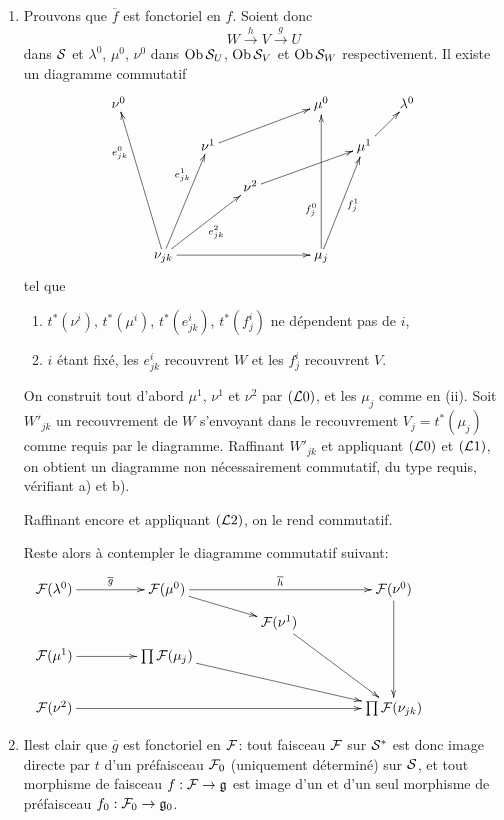\documentclass[10pt]{../fichiers-configuration-latex/smfart}
\begin{document}
\begin{enumerate}
\item Prouvons que $\overline{f}$ est fonctoriel en $f$. Soient donc
$$
W \xrightarrow{h} V \xrightarrow{g}U
$$
dans ${\mathcal S}$ et $\lambda^{0}$, $\mu^{0}$, $\nu^{0}$ dans $\operatorname{Ob}
{\mathcal S}_U$, $\operatorname{Ob} {\mathcal S}_{V}$ et $\operatorname{Ob} {\mathcal S}_W$ respectivement. Il existe un diagramme commutatif
\[
\xymatrix@C=.5cm@R=.5cm{
\nu^{0}  &         &          &         &        &\mu^{0} &        & \lambda^{0}\\
         &         &\nu^{1}\ar[rrru]   &         &        & &\mu^{1}\ar[ru] &            \\
         &         &          & {\nu^{2}}\ar[rrru] &       &&         &\\
         &        &         &         &       & &        & \\
         &\nu_{jk} \ar[luuuu]^(.7){e^{0}_{jk}} \ar[uuur]^(.7){e^{1}_{jk}} \ar[rruu]_{e^{2}_{jk}} \ar[rrrr]&  &        &         & \mu_j \ar[uuur]_{f^{1}_j}   \ar[uuuu]^(.3){f^{0}_j}  &         &
}
\]
tel que

\begin{enumerate}
\renewcommand{\theenumii}{\alph {enumii}}
\renewcommand{\labelenumii}{\theenumii)}
\item $t^{\ast} (\nu^i)$, $t^{\ast} (\mu^i)$, $t^{\ast} (e^i_{jk})$, $t^{\ast} (f^i_j)$ ne
  dépendent pas de $i$,

\item $i$ étant fixé, les $e^i_{jk}$ recouvrent $W$ et les $f^i_j$
  recouvrent $V$.
\end{enumerate}

On construit tout d'abord $\mu^1$, $\nu^1$ et $\nu^2$ par
$({\mathcal L}0)$, et les $\mu_j$ comme en (ii). Soit $W'_{jk}$ un
recouvrement de $W$ s'envoyant dans le recouvrement $V_j = t^{\ast}(\mu_j)$
comme requis par le diagramme. Raffinant ${W'}_{jk}$ et appliquant
$({\mathcal L}0)$ et $({\mathcal L}1)$, on obtient un diagramme non
nécessairement commutatif, du type requis, vérifiant a) et
b).

Raffinant encore et appliquant $({\mathcal L}2)$, on le rend
commutatif.

Reste alors à contempler le diagramme commutatif suivant:
\[
\xymatrix@C=1.5cm@R=.25cm{
  \Ff(\lambda^{0}) \ar[r]^{\bar{g}}& \Ff(\mu^0) \ar[rd]\ar[rr]^{\bar{h}}& &\Ff(\nu^{0})\ar[dddd] \\                                  &            &\Ff(\nu^1)\ar[rddd]   &   \\
\Ff(\mu^{1}) \ar[r]& \prod\Ff(\mu_j)\ar[rrdd]     &            &
  &  \\
 & & &\\
\Ff(\nu^2) \ar[rrr]&      &             &   \prod\Ff(\nu_{jk})
}
\]

\item Il\pageoriginale est clair que $\overline{g}$ est fonctoriel en
  ${\mathcal F}$: tout faisceau ${\mathcal F}$ sur ${\mathcal S}^{\ast}$ est donc
  image directe par $t$ d'un préfaisceau ${\mathcal F}_{0}$
  (uniquement déterminé) sur ${\mathcal S}$, et tout morphisme de faisceau $f :
  \Ff \to \mathfrak{g}$ est image d'un et d'un seul morphisme
  de préfaisceau $f_{0} : \Ff_{0} \to \mathfrak{g}_{0}$.
\end{enumerate}
\end{document}
